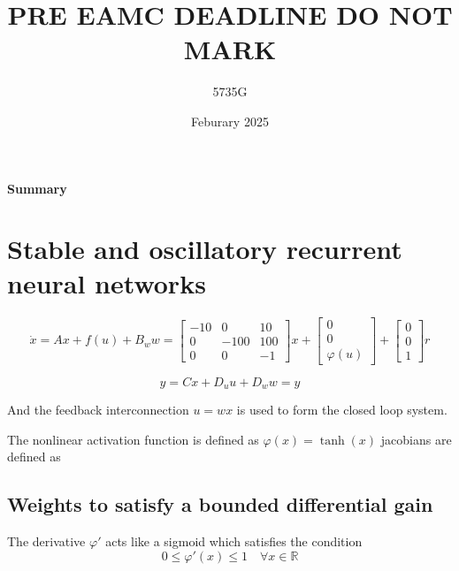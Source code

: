 \documentclass{article}
\begin{document}
\title{PRE EAMC DEADLINE DO NOT MARK}
\author{5735G}
\date{Feburary 2025}
\maketitle 

\begin{center}
    \textbf{Summary} \\
    
\end{center}

\section{Stable and oscillatory recurrent neural networks}

\begin{equation}
    \dot{x} = Ax + f(u) + B_w w = \begin{bmatrix}
        -10 & 0 & 10 \\
        0 & -100 & 100 \\
        0 & 0 & -1
    \end{bmatrix} x + \begin{bmatrix}
        0 \\ 0 \\ \varphi(u)
    \end{bmatrix} + \begin{bmatrix}
        0 \\ 0 \\ 1
    \end{bmatrix} r
\end{equation}

\begin{equation}
    y = Cx + D_u u + D_w w = y
\end{equation}

And the feedback interconnection $u = w x$ is used to form the closed loop system.

The nonlinear activation function is defined as $\varphi(x) = \tanh(x)$ jacobians are defined as

\subsection{Weights to satisfy a bounded differential gain}

The derivative $\varphi'$ acts like a sigmoid which satisfies the condition
\begin{equation}
    0 \leq \varphi'(x) \leq 1 \quad \forall x \in \mathbb{R}
\end{equation}
\end{document}
